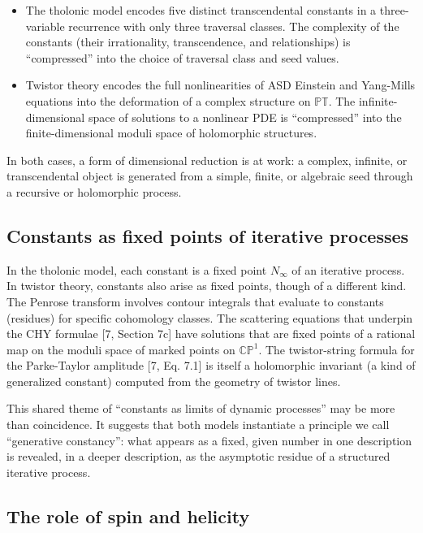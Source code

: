 \documentclass[12pt]{article}
\providecommand{\tightlist}{%
  \setlength{\itemsep}{0pt}\setlength{\parskip}{0pt}}
\begin{document}
\begin{itemize}
\tightlist
\item
  The tholonic model encodes five distinct transcendental constants in a
  three-variable recurrence with only three traversal classes. The
  complexity of the constants (their irrationality, transcendence, and
  relationships) is ``compressed'' into the choice of traversal class
  and seed values.
\item
  Twistor theory encodes the full nonlinearities of ASD Einstein and
  Yang-Mills equations into the deformation of a complex structure on
  \(\mathbb{PT}\). The infinite-dimensional space of solutions to a
  nonlinear PDE is ``compressed'' into the finite-dimensional moduli
  space of holomorphic structures.
\end{itemize}

In both cases, a form of dimensional reduction is at work: a complex,
infinite, or transcendental object is generated from a simple, finite,
or algebraic seed through a recursive or holomorphic process.

\subsection{Constants as fixed points of iterative processes}\label{constants-as-fixed-points-of-iterative-processes}

In the tholonic model, each constant is a fixed point \(N_\infty\) of an
iterative process. In twistor theory, constants also arise as fixed
points, though of a different kind. The Penrose transform involves
contour integrals that evaluate to constants (residues) for specific
cohomology classes. The scattering equations that underpin the CHY
formulae {[}7, Section 7c{]} have solutions that are fixed points of a
rational map on the moduli space of marked points on \(\mathbb{CP}^1\).
The twistor-string formula for the Parke-Taylor amplitude {[}7, Eq.
7.1{]} is itself a holomorphic invariant (a kind of generalized
constant) computed from the geometry of twistor lines.

This shared theme of ``constants as limits of dynamic processes'' may be
more than coincidence. It suggests that both models instantiate a
principle we call ``generative constancy'': what appears as a fixed,
given number in one description is revealed, in a deeper description, as
the asymptotic residue of a structured iterative process.

\subsection{The role of spin and helicity}\label{the-role-of-spin-and-helicity}
\end{document}
